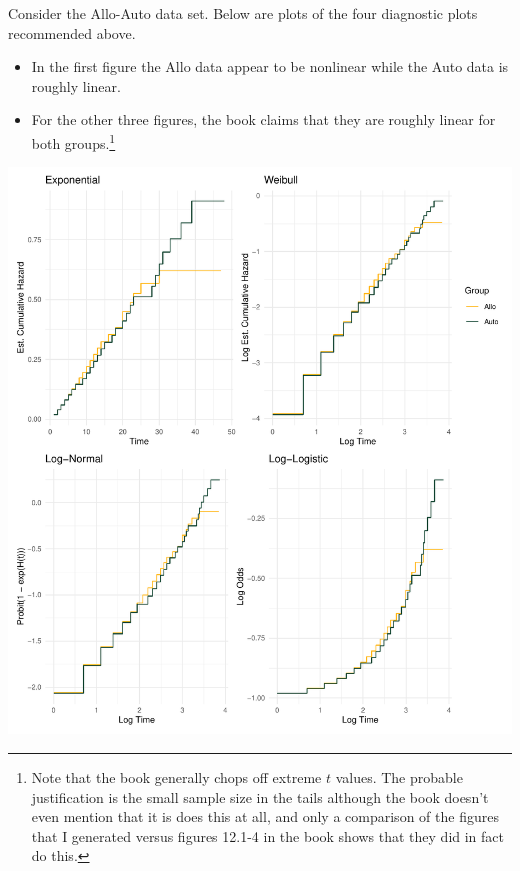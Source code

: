 \documentclass[10pt]{article}\usepackage[]{graphicx}\usepackage[]{xcolor}
\makeatletter
\def\maxwidth{ %
  \ifdim\Gin@nat@width>\linewidth
    \linewidth
  \else
    \Gin@nat@width
  \fi
}
\newenvironment{knitrout}{}{} %
\theoremstyle{definition}
\numberwithin{equation}{subsection}
\numberwithin{figure}{section}
\numberwithin{table}{subsection}
\numberwithin{Report}{section}
\numberwithin{Example}{subsection}
\makeatother
\begin{document}
\noindent Consider the Allo-Auto data set. Below are plots of the
four diagnostic plots recommended above.
\begin{itemize}
	\item In the first figure the Allo data
appear to be nonlinear while the Auto data is roughly linear.
	\item  For the other three figures, the book claims that they are roughly linear
for both groups.\footnote{Note that the book generally chops off extreme $t$ values. The probable
justification is the small sample size in the tails although the book
doesn't even mention that it is does this at all, and only a comparison
of the figures that I generated versus figures 12.1-4 in the book
shows that they did in fact do this.}
\end{itemize}

\newpage



\begin{knitrout}
\color{fgcolor}

{\centering \includegraphics[width=\maxwidth]{figure/unnamed-chunk-1-1} 

}


\end{knitrout}
\end{document}
